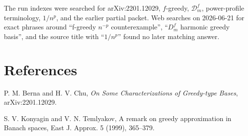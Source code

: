 \documentclass[11pt]{article}
\theoremstyle{definition}
\newcommand{\calD}{\mathcal D}
\begin{document}
The run indexes were searched for arXiv:2201.12029, \(f\)-greedy,
\(\calD_m^f\), power-profile terminology, \(1/n^p\), and the earlier partial
packet.  Web searches on 2026-06-21 for exact phrases around
``f-greedy \(n^{-p}\) counterexample'', ``\(D_m^f\) harmonic greedy basis'',
and the source title with ``\(1/n^p\)'' found no later matching answer.

\section*{References}

\begin{enumerate}[label={[\arabic*]}]
\item P. M. Berna and H. V. Chu,
      \emph{On Some Characterizations of Greedy-type Bases},
      arXiv:2201.12029.
\item S. V. Konyagin and V. N. Temlyakov,
      A remark on greedy approximation in Banach spaces,
      East J. Approx. 5 (1999), 365--379.
\end{enumerate}
\end{document}
